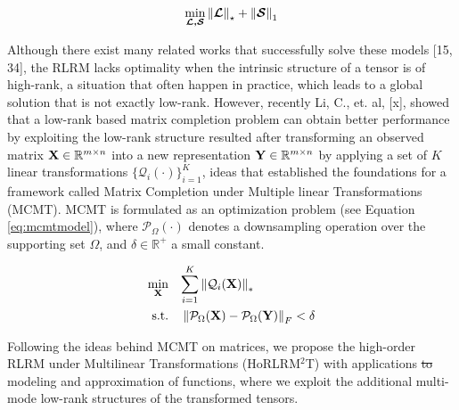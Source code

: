 \documentclass[sensors,article,submit,moreauthors,pdftex]{Definitions/mdpi}
\newcommand{\mathmat}[1]{\boldsymbol{\mathbf{\MakeUppercase{#1}}}}
\newcommand{\mathten}[1]{\boldsymbol{\mathbf{\mathcal{\MakeUppercase{#1}}}}}
\providecommand{\DIFadd}[1]{{\protect\color{blue}\uwave{#1}}} %
\providecommand{\DIFdel}[1]{{\protect\color{red}\sout{#1}}}                      %
\providecommand{\DIFaddbegin}{} %
\providecommand{\DIFaddend}{} %
\providecommand{\DIFdelbegin}{} %
\providecommand{\DIFdelend}{} %
\begin{document}
\begin{equation}
\min_{\mathten{L,S}} {\left\lVert\mathten{L}\right\rVert_\star + \left\lVert\mathten{S}\right\rVert_1}
\label{eq:lowrankmodel2}
\end{equation}


Although there exist many related works that successfully solve these models [15, 34], the RLRM lacks optimality when the intrinsic structure of a tensor is of high-rank, a situation that often happen in practice, which leads to a global solution that is not exactly low-rank. However, recently Li, C., et. al, [x], showed that a low-rank based matrix completion problem can obtain better performance by exploiting the low-rank structure resulted after transforming an observed matrix $\mathmat{X}\in\mathbb{R}^{m \times n}$ into a new representation $\mathmat{Y}\in\mathbb{R}^{m \times n}$ by applying a set of $K$ linear transformations $\{\mathcal{Q}_i(\cdot)\}_{i=1}^K$, ideas that established the foundations for a framework called Matrix Completion under Multiple linear Transformations (MCMT). MCMT is formulated as an optimization problem (see Equation \ref{eq:mcmtmodel}), where $\mathcal{P}_\Omega(\cdot)$ denotes a downsampling operation over the supporting set $\Omega$, and $\delta\in\mathbb{R}^+$ a small constant.

\begin{equation}
	\begin{aligned}
		\min_{\mathmat{X}} \quad & {\sum_{i=1}^{K} \left\lVert \mathcal{Q}_i(\mathmat{X}) \right\rVert_*}\\
		\textrm{s.t.} \quad & \left\lVert \mathcal{P}_\Omega(\mathmat{X}) - \mathcal{P}_\Omega(\mathmat{Y}) \right\rVert_F < \delta
	\end{aligned}
\label{eq:mcmtmodel}
\end{equation}

Following the ideas behind MCMT on matrices, we propose the high-order RLRM under Multilinear Transformations (HoRLRM$^2$T) with applications \DIFdelbegin \DIFdel{to }\DIFdelend \DIFaddbegin \DIFadd{for }\DIFaddend modeling and approximation of functions, where we exploit the additional multi-mode low-rank structures of the transformed tensors.
\DIFaddbegin 
\end{document}
